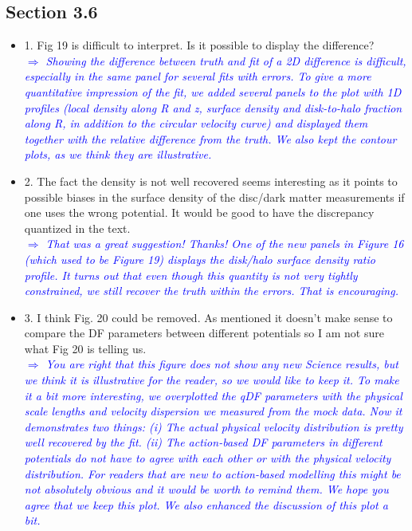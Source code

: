 \documentclass[10pt,a4paper]{article}
\newcommand{\Comment}[1]{\textsl{\textcolor{Blue}{$\Longrightarrow$ {#1}}}}
\begin{document}
\subsection{Section 3.6}
\begin{itemize}
\item 1. Fig 19 is difficult to interpret. Is it possible to display the difference? \\\Comment{Showing the difference between truth and fit of a 2D difference is difficult, especially in the same panel for several fits with errors. To give a more quantitative impression of the fit, we added several panels to the plot with 1D profiles (local density along R and z, surface density and disk-to-halo fraction along R, in addition to the circular velocity curve)  and displayed them together with the relative difference from the truth. We also kept the contour plots, as we think they are illustrative.} 
\item 2. The fact the density is not well recovered seems interesting as it points to possible biases in the surface density of the disc/dark matter measurements if one uses the wrong potential. It would be good to have the discrepancy quantized in the text. \\\Comment{That was a great suggestion! Thanks! One of the new panels in Figure 16 (which used to be Figure 19) displays the disk/halo surface density ratio profile. It turns out that even though this quantity is not very tightly constrained, we still recover the truth within the errors. That is encouraging.}
\item 3. I think Fig. 20 could be removed. As mentioned it doesn't make sense to compare the DF parameters between different potentials so I am not sure what Fig 20 is telling us. \\\Comment{You are right that this figure does not show any new Science results, but we think it is illustrative for the reader, so we would like to keep it. To make it a bit more interesting, we overplotted the qDF parameters with the physical scale lengths and velocity dispersion we measured from the mock data. Now it demonstrates two things: (i) The actual physical velocity distribution is pretty well recovered by the fit. (ii) The action-based DF parameters in different potentials do not have to agree with each other or with the physical velocity distribution. For readers that are new to action-based modelling this might be not absolutely obvious and it would be worth to remind them. We hope you agree that we keep this plot. We also enhanced the discussion of this plot a bit.}

\end{itemize}
\end{document}
